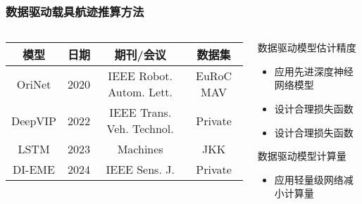 \begin{frame}
	\frametitle{数据驱动载具航迹推算方法}
	\begin{columns}[t]
		\begin{column}{0.5\textwidth}
		{
		    \tiny
		    \setlength{\tabcolsep}{2pt}
			\begin{tabular*}{\linewidth}{@{\extracolsep{\fill}}cccc}
				\toprule
				\multicolumn{1}{c}{模型} & 日期 & 期刊/会议 & 数据集 \\
				\midrule
				OriNet  & 2020 & IEEE Robot. Autom. Lett.  & EuRoC MAV \\
				DeepVIP & 2022 & IEEE Trans. Veh. Technol. & Private   \\ %
				LSTM    & 2023 & Machines                  & JKK       \\
				DI-EME  & 2024 & IEEE Sens. J.             & Private   \\
				\bottomrule
			\end{tabular*}         
		}
		\end{column}   
		\begin{column}{0.5\textwidth}
			\begin{block}{数据驱动模型估计精度}
			    {
			        \footnotesize
					\begin{itemize}
						\item 应用先进深度神经网络模型
						\item 设计合理损失函数
						\item 设计合理损失函数
					\end{itemize}			    
			    }
			\end{block}
			\begin{block}{数据驱动模型计算量}
			    {
			        \footnotesize
					\begin{itemize}
						\item 应用轻量级网络减小计算量
					\end{itemize}
				}
			\end{block}
		\end{column}
	\end{columns}	
\end{frame}

